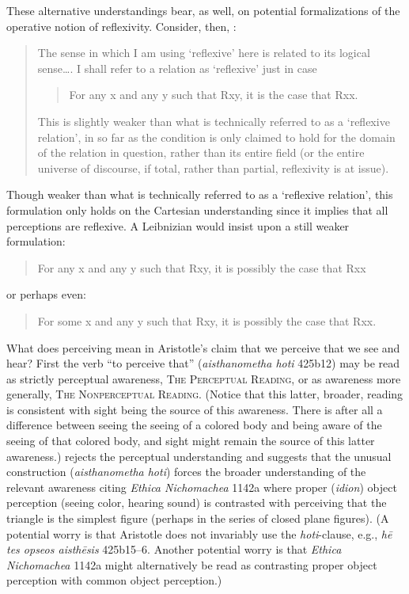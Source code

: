 These alternative understandings bear, as well, on potential formalizations of the operative notion of reflexivity. Consider, then, \citet[778 n56]{caston02}:
\begin{quotation}
	The sense in which I am using ‘reflexive’ here is related to its logical sense\ldots. I shall refer to a relation as ‘reflexive’ just in case 
	\begin{quote}
	For any x and any y such that Rxy, it is the case that Rxx.
	\end{quote}
	This is slightly weaker than what is technically referred to as a ‘reflexive relation’, in so far as the condition is only claimed to hold for the domain of the relation in question, rather than its entire field (or the entire universe of discourse, if total, rather than partial, reflexivity is at issue).
\end{quotation}
Though weaker than what is technically referred to as a ‘reflexive relation’, this formulation only holds on the Cartesian understanding since it implies that all perceptions are reflexive. A Leibnizian would insist upon a still weaker formulation:
\begin{quote}
	For any x and any y such that Rxy, it is possibly the case that Rxx
\end{quote}
or perhaps even:
\begin{quote}
	For some x and any y such that Rxy, it is possibly the case that Rxx.
\end{quote}

What does perceiving mean in Aristotle's claim that we perceive that we see and hear? First the verb ``to perceive that'' (\emph{aisthanometha hoti} 425b12) may be read as strictly perceptual awareness, \textsc{The Perceptual Reading}, or as awareness more generally, \textsc{The Nonperceptual Reading}. (Notice that this latter, broader, reading is consistent with sight being the source of this awareness. There is after all a difference between seeing the seeing of a colored body and being aware of the seeing of that colored body, and sight might remain the source of this latter awareness.) \citet[265–6]{Shields:2016ix} rejects the perceptual understanding and suggests that the unusual construction (\emph{aisthanometha hoti}) forces the broader understanding of the relevant awareness citing \emph{Ethica Nichomachea} 1142\-a where proper (\emph{idion}) object perception (seeing color, hearing sound) is contrasted with perceiving that the triangle is the simplest figure (perhaps in the series of closed plane figures). (A potential worry is that Aristotle does not invariably use the \emph{hoti}-clause, e.g., \emph{hē tes opseos aisthēsis} 425b15–6. Another potential worry is that \emph{Ethica Nichomachea} 1142\-a might alternatively be read as contrasting proper object perception with common object perception.) 

